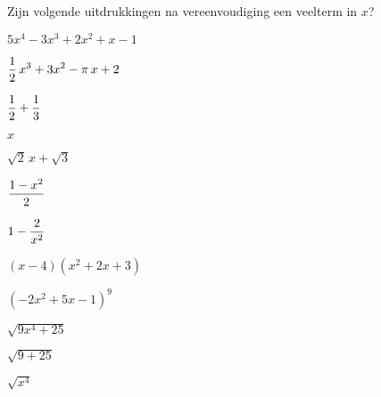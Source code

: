 \documentclass{ximera}
\begin{document}
\begin{exercise}
Zijn volgende uitdrukkingen na vereenvoudiging een veelterm in $x$? 
\renewcommand{\TJa }{\makebox[2.5cm]{Veelterm}}
\renewcommand{\TNee}{\makebox[2.5cm]{Geen veelterm}}
\begin{multicols}{2}

	\begin{question} \choiceYes \( 5x^4-3x^3+2x^2+x-1                    \)   \end{question}
	\begin{question} \choiceYes \( \displaystyle \frac{1}{2}\,x^3 + 3x^2-\pi\,x+2   \)   \end{question}
	\begin{question} \choiceYes \( \displaystyle \frac{1}{2}+\frac{1}{3}            \)   \end{question}
	\begin{question} \choiceYes \( x                                     \)   \end{question}
	\begin{question} \choiceYes \( \sqrt{2}\,x + \sqrt{3}                \)   \end{question}
	\begin{question} \choiceYes \( \displaystyle \frac{1-x^2}{2}                    \)   \end{question}
	\begin{question} \choiceNo  \( \displaystyle 1-\frac{2}{x^2}                    \)   \end{question}
	\begin{question} \choiceYes \( (x-4)(x^2+2x+3)                       \)   \end{question}
	\begin{question} \choiceYes \( (-2x^2+5x-1)^{9}                      \)   \end{question}
	\begin{question} \choiceNo  \( \sqrt{9x^4+25}                        \)   \end{question}
	\begin{question} \choiceYes \( \sqrt{9+25}                           \)   \end{question}
	\begin{question} \choiceYes \( \sqrt{x^4}                            \)   \end{question}

\end{multicols}
\end{exercise}
\end{document}

